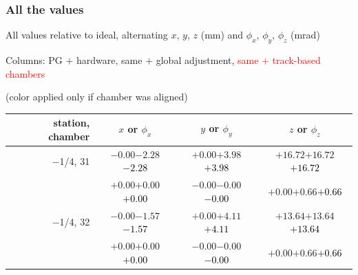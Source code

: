 \documentclass[compress]{beamer}
\begin{document}
\begin{frame}
\frametitle{All the values}
\tiny

All values relative to ideal, alternating $x$, $y$, $z$ (mm) and $\phi_x$, $\phi_y$, $\phi_z$ (mrad)

Columns: PG $+$ hardware, same $+$ global adjustment, \textcolor{red}{same $+$ track-based chambers}

\hfill (color applied only if chamber was aligned)

\vfill
\renewcommand{\arraystretch}{1.1}
\begin{tabular}{r | c | c | c}
station, chamber & $x$ or $\phi_x$ & $y$ or $\phi_y$ & $z$ or $\phi_z$ \\\hline
$-$1/4, 31 & $-0.00$\hspace{0.1 cm}$-2.28$\hspace{0.1 cm}\textcolor{black}{$-2.28$} & $+0.00$\hspace{0.1 cm}$+3.98$\hspace{0.1 cm}\textcolor{black}{$+3.98$} & $+16.72$\hspace{0.1 cm}$+16.72$\hspace{0.1 cm}\textcolor{black}{$+16.72$} \\
           & $+0.00$\hspace{0.1 cm}$+0.00$\hspace{0.1 cm}\textcolor{black}{$+0.00$} & $-0.00$\hspace{0.1 cm}$-0.00$\hspace{0.1 cm}\textcolor{black}{$-0.00$} & $+0.00$\hspace{0.1 cm}$+0.66$\hspace{0.1 cm}\textcolor{black}{$+0.66$} \\
$-$1/4, 32 & $-0.00$\hspace{0.1 cm}$-1.57$\hspace{0.1 cm}\textcolor{black}{$-1.57$} & $+0.00$\hspace{0.1 cm}$+4.11$\hspace{0.1 cm}\textcolor{black}{$+4.11$} & $+13.64$\hspace{0.1 cm}$+13.64$\hspace{0.1 cm}\textcolor{black}{$+13.64$} \\
           & $+0.00$\hspace{0.1 cm}$+0.00$\hspace{0.1 cm}\textcolor{black}{$+0.00$} & $-0.00$\hspace{0.1 cm}$-0.00$\hspace{0.1 cm}\textcolor{black}{$-0.00$} & $+0.00$\hspace{0.1 cm}$+0.66$\hspace{0.1 cm}\textcolor{black}{$+0.66$} \\

\end{tabular}
\end{frame}
\end{document}
